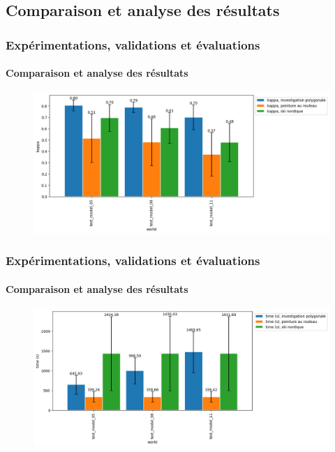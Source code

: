 \documentclass{beamer}
\begin{document}
		\subsection{Comparaison et analyse des résultats}
			\begin{frame}
				\frametitle{Expérimentations, validations et évaluations}
				\framesubtitle{Comparaison et analyse des résultats}
				\begin{figure}[H]
					\includegraphics[width=\linewidth]{graphics/investigation_polygonale-peinture_au_rouleau_ski_nordique-kappa_for_each_world_vs_investigation_polygonale-kappa_for_each_world.png}
				\end{figure}
			\end{frame}
			\begin{frame}
				\frametitle{Expérimentations, validations et évaluations}
				\framesubtitle{Comparaison et analyse des résultats}
				\begin{figure}[H]
					\includegraphics[width=\linewidth]{graphics/investigation_polygonale-peinture_au_rouleau_ski_nordique-time_for_each_world_vs_investigation_polygonale-time_for_each_world.png}
				\end{figure}
			\end{frame}
\end{document}

